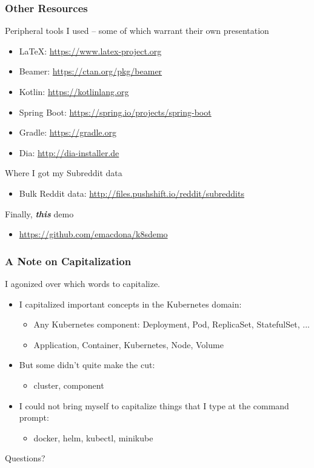 \documentclass{beamer}
\begin{document}
\begin{frame}
\frametitle{Other Resources}
Peripheral tools I used -- some of which warrant their own presentation
\begin{itemize}
    \item \LaTeX: \href{https://www.latex-project.org}{https://www.latex-project.org}
    \item Beamer: \href{https://ctan.org/pkg/beamer}{https://ctan.org/pkg/beamer}
    \item Kotlin: \href{https://kotlinlang.org}{https://kotlinlang.org}
    \item Spring Boot: \href{https://spring.io/projects/spring-boot}{https://spring.io/projects/spring-boot}
    \item Gradle: \href{https://gradle.org}{https://gradle.org}
    \item Dia: \href{http://dia-installer.de}{http://dia-installer.de}
\end{itemize}
\smallskip
Where I got my Subreddit data
\begin{itemize}
    \item Bulk Reddit data: \href{http://files.pushshift.io/reddit/subreddits}{http://files.pushshift.io/reddit/subreddits}
\end{itemize}
Finally, \textbf{\textit{this}} demo
\begin{itemize}
    \item \href{https://github.com/emacdona/k8sdemo}{https://github.com/emacdona/k8sdemo}
\end{itemize}
\end{frame}

\begin{frame}
\frametitle{A Note on Capitalization}
I agonized over which words to capitalize.
\begin{itemize}
   \item{I capitalized important concepts in the Kubernetes domain:}
   \begin{itemize}
      \item{Any Kubernetes component: Deployment, Pod, ReplicaSet, StatefulSet, ...}
      \item{Application, Container, Kubernetes, Node, Volume}
   \end{itemize}

   \item{But some didn't quite make the cut:}
   \begin{itemize}
      \item{cluster, component}
   \end{itemize}

   \item{I could not bring myself to capitalize things that I type at the command prompt:}
   \begin{itemize}
      \item{docker, helm, kubectl, minikube}
   \end{itemize}
\end{itemize}
\end{frame}

\begin{frame}
    \begin{center}
        \Huge Questions?
    \end{center}
\end{frame}
\end{document}
